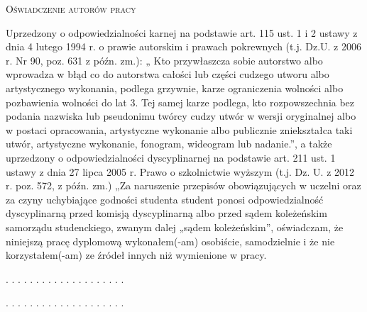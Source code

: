 \thispagestyle{zzz}
\vspace*{\fill}
\begin{center}
\Large\textsc{Oświadczenie autorów pracy}
\end{center}
\begin{addmargin}[5em]{1em}%
Uprzedzony o odpowiedzialności karnej na podstawie art. 115 ust. 1 i 2 ustawy z dnia 
4 lutego 1994 r. o prawie autorskim i prawach pokrewnych (t.j. Dz.U. z 2006 r. Nr 90, poz. 631 z późn. zm.): „ Kto przywłaszcza sobie autorstwo albo wprowadza w błąd co do autorstwa całości lub części cudzego utworu albo artystycznego wykonania, podlega grzywnie, karze ograniczenia wolności albo pozbawienia wolności do lat 3. Tej samej karze podlega, kto rozpowszechnia bez podania nazwiska lub pseudonimu twórcy cudzy utwór 
w wersji oryginalnej albo w postaci opracowania, artystyczne wykonanie albo publicznie zniekształca taki utwór, artystyczne wykonanie, fonogram, wideogram lub nadanie.”, a także uprzedzony o odpowiedzialności dyscyplinarnej na podstawie art. 211 ust. 1 ustawy z dnia 
27 lipca 2005 r. Prawo o szkolnictwie wyższym (t.j. Dz. U. z 2012 r. poz. 572, z późn. zm.) „Za naruszenie przepisów obowiązujących w uczelni oraz za czyny uchybiające godności studenta student ponosi odpowiedzialność dyscyplinarną przed komisją dyscyplinarną albo przed sądem koleżeńskim samorządu studenckiego, zwanym dalej „sądem koleżeńskim”, oświadczam, że niniejszą pracę dyplomową wykonałem(-am) osobiście, samodzielnie i że nie korzystałem(-am) ze źródeł innych niż wymienione w pracy.
\end{addmargin}
\vspace{1cm}
\begin{flushright}
. . . . . . . . . . . . . . . . . . . .\vspace{1cm}

. . . . . . . . . . . . . . . . . . . .
\end{flushright}
\vspace{3cm}